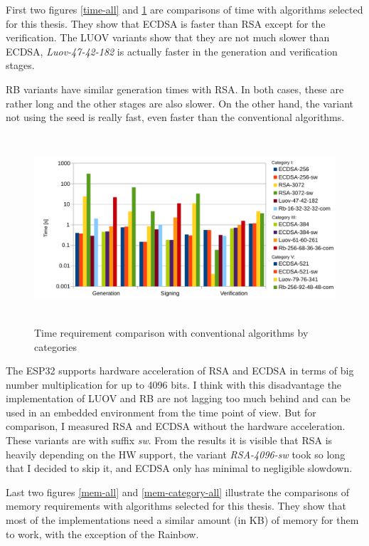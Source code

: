 \documentclass[thesis=M,english]{FITthesis}[2019/12/23]
\begin{document}
\noindent
First two figures \ref{time-all} and \ref{time-category-all} are comparisons of time with algorithms selected for this thesis. They show that ECDSA is faster than RSA except for the verification. The LUOV variants show that they are not much slower than ECDSA, \textit{Luov-47-42-182} is actually faster in the generation and verification stages. 

\bigskip
\noindent
RB variants have similar generation times  with RSA. In both cases, these are rather long and the other stages are also slower. On the other hand, the variant not using the seed is really fast, even faster than the conventional algorithms. 

\begin{figure}[H]
\centering
\includegraphics[width=13cm,height=7cm]{images/time-category-all.pdf}
\caption{Time requirement comparison with conventional algorithms by categories}
\label{time-category-all}
\end{figure}

\bigskip
\noindent
The ESP32 supports hardware acceleration of RSA and ECDSA in terms of big number multiplication for up to 4096 bits. I think with this disadvantage the implementation of LUOV and RB are not lagging too much behind and can be used in an embedded environment from the time point of view. But for comparison, I measured RSA and ECDSA without the hardware acceleration. These variants are with suffix \textit{sw}. From the results it is visible that RSA is heavily depending on the HW support, the variant \textit{RSA-4096-sw} took so long that I decided to skip it, and ECDSA only has minimal to negligible slowdown. 

\bigskip
\noindent
Last two figures \ref{mem-all} and \ref{mem-category-all} illustrate the comparisons of memory requirements with algorithms selected for this thesis. They show that most of the implementations need a similar  amount (in KB) of memory for them to work, with the exception of the Rainbow. 
\end{document}
